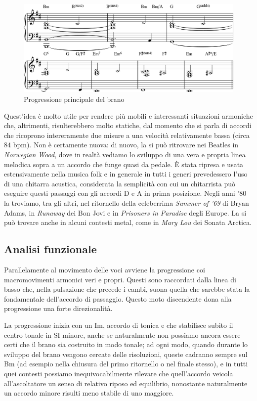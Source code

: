 \documentclass[12pt]{article}
\begin{document}
\begin{figure}[H]
 \centering
 \includegraphics[width=\textwidth,keepaspectratio]{aa/main-progression}
 \caption{Progressione principale del brano}
 \label{fig:progression}
\end{figure}

Quest'idea è molto utile per rendere più mobili e interessanti situazioni armoniche che, altrimenti, risulterebbero molto statiche, dal momento che si parla di accordi che ricoprono intereramente due misure a una velocità relativamente bassa (circa \(84\) bpm). Non è certamente nuova: di nuovo, la si può ritrovare nei Beatles in \emph{Norwegian Wood}, dove in realtà vediamo lo sviluppo di una vera e propria linea melodica sopra a un accordo che funge quasi da pedale. È stata ripresa e usata estensivamente nella musica folk e in generale in tutti i generi prevedessero l'uso di una chitarra acustica, considerata la semplicità con cui un chitarrista può eseguire questi passaggi con gli accordi D e A in prima posizione. Negli anni '\(80\) la troviamo, tra gli altri, nel ritornello della celeberrima \emph{Summer of '69} di Bryan Adams, in \emph{Runaway} dei Bon Jovi e in \emph{Prisoners in Paradise} degli Europe. La si può trovare anche in alcuni contesti metal, come in \emph{Mary Lou} dei Sonata Arctica.

\subsection{Analisi funzionale}
Parallelamente al movimento delle voci avviene la progressione coi macromovimenti armonici veri e propri. Questi sono raccordati dalla linea di basso che, nella pulsazione che precede i cambi, suona quella che sarebbe stata la fondamentale dell'accordo di passaggio. Questo moto discendente dona alla progressione una forte direzionalità.

La progressione inizia con un Im, accordo di tonica e che stabilisce subito il centro tonale in SI minore, anche se naturalmente non possiamo ancora essere certi che il brano sia costruito in modo tonale; ad ogni modo, quando durante lo sviluppo del brano vengono cercate delle risoluzioni, queste cadranno sempre sul Bm (ad esempio nella chiusura del primo ritornello o nel finale stesso), e in tutti quei contesti possiamo inequivocabilmente rilevare che quell'accordo veicola all'ascoltatore un senso di relativo riposo ed equilibrio, nonostante naturalmente un accordo minore risulti meno stabile di uno maggiore.
\end{document}

